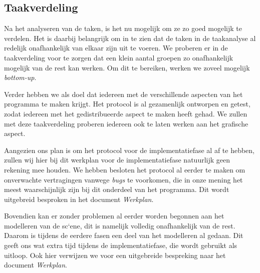 \documentclass[a4paper,11pt]{article}
\begin{document}
    \subsection{Taakverdeling}
    Na het analyseren van de taken, is het nu mogelijk om ze zo goed mogelijk te verdelen. Het is daarbij belangrijk om in te zien dat de taken in de taakanalyse al redelijk onafhankelijk van elkaar zijn uit te voeren. We proberen er in de taakverdeling voor te zorgen dat een klein aantal groepen zo onafhankelijk mogelijk van de rest kan werken. Om dit te bereiken, werken we zoveel mogelijk \emph{bottom-up}.

    Verder hebben we als doel dat iedereen met de verschillende aspecten van het programma te maken krijgt. Het protocol is al gezamenlijk ontworpen en getest, zodat iedereen met het gedistribueerde aspect te maken heeft gehad. We zullen met deze taakverdeling proberen iedereen ook te laten werken aan het grafische aspect.

    Aangezien ons plan is om het protocol voor de implementatiefase al af te hebben, zullen wij hier bij dit werkplan voor de implementatiefase natuurlijk geen rekening mee houden. We hebben besloten het protocol al eerder te maken om onverwachte vertragingen vanwege \emph{bugs} te voorkomen, die in onze mening het meest waarschijnlijk zijn bij dit onderdeel van het programma. Dit wordt uitgebreid besproken in het document \emph{Werkplan}.

    Bovendien kan er zonder problemen al eerder worden begonnen aan het modelleren van de sc`ene, dit is namelijk volledig onafhankelijk van de rest. Daarom is tijdens de eerdere fasen een deel van het modelleren al gedaan. Dit geeft ons wat extra tijd tijdens de implementatiefase, die wordt gebruikt als uitloop. Ook hier verwijzen we voor een uitgebreide bespreking naar het document \emph{Werkplan}.
\end{document}
